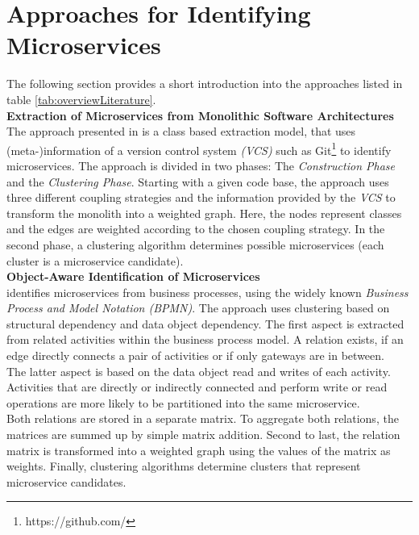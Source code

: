 \clearpage





\section{Approaches for Identifying Microservices}
\label{sec:stateOfTheArt:approaches}
The following section provides a short introduction into the approaches listed in table \ref{tab:overviewLiterature}. \\

\noindent
\textbf{Extraction of Microservices from Monolithic Software Architectures   } \\
The approach presented in \cite{ExtractionMazlami} is a class based extraction model, that uses (meta-)information of a version control system \textit{(VCS)} such as Git\footnote{https://github.com/} to identify microservices. The approach is divided in two phases: The \textit{Construction Phase} and the \textit{Clustering Phase}.
Starting with a given code base, the approach uses three different coupling strategies and the information provided by the \textit{VCS} to transform the monolith into a weighted graph. Here, the nodes represent classes and the edges are weighted according to the chosen coupling strategy. In the second phase, a clustering algorithm determines possible microservices (each cluster is a microservice candidate). \\

\noindent
\textbf{Object-Aware Identification of Microservices  } \\
\cite{ObjectAwareAmiri} identifies microservices from business processes, using the widely known \textit{Business Process and Model Notation (BPMN)}. The approach uses clustering based on structural dependency and data object dependency. The first aspect is extracted from related activities within the business process model. A relation exists, if an edge directly connects a pair of activities or if only gateways are in between. \\
The latter aspect is based on the data object read and writes of each activity. Activities that are directly or indirectly connected and perform write or read operations are more likely to be partitioned into the same microservice. \\
Both relations are stored in a separate matrix. To aggregate both relations, the matrices are summed up by simple matrix addition. Second to last, the relation matrix is transformed into a weighted graph using the values of the matrix as weights. Finally, clustering algorithms determine clusters that represent microservice candidates.\\


